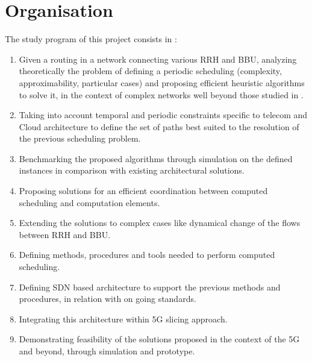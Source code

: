\documentclass{article}
\begin{document}
\section*{Organisation}
The study program of this project consists in :
 \begin{enumerate}
  \item Given a routing in a network connecting various RRH and BBU, analyzing theoretically the problem of defining a periodic scheduling (complexity, approximability, particular cases) and proposing efficient heuristic algorithms to solve it, in the context of complex networks well beyond those studied in \cite{rapportstage}.
  \item Taking into account temporal and periodic constraints specific to telecom and Cloud architecture to define the set of paths  best suited to the resolution of  the previous scheduling problem.
\item  Benchmarking the proposed algorithms through simulation on the defined instances in comparison with existing architectural solutions.
\item  Proposing solutions for an efficient coordination between computed scheduling and computation elements.
\item  Extending the solutions to complex cases like dynamical change of the flows between RRH and BBU.
\item  Defining methods, procedures and tools needed to perform computed scheduling.
\item  Defining SDN based architecture to support the previous methods and procedures, in relation with on going standards.
\item  Integrating this architecture within 5G slicing approach.
\item  Demonstrating feasibility of the solutions proposed in the context of the 5G and beyond, through simulation and prototype.
 \end{enumerate}
\end{document}
